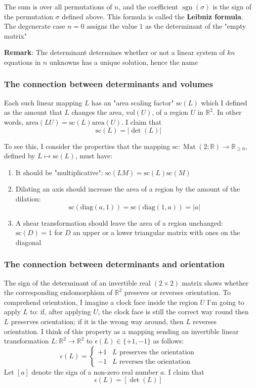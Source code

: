\documentclass{article}
\DeclareMathOperator{\sgn}{sgn}
\DeclareMathOperator{\Mat}{Mat}
\begin{document}
The sum is over all permutations of $n$, and the coefficient $\sgn(\sigma)$ is the sign of the permutation $\sigma$ defined above. This formula is called the \textbf{Leibniz formula}. The degenerate case $n = 0$ assigns the value $1$ as the determinant of the "empty matrix"

\textbf{Remark}: The determinant determines whether or not a linear system of $kn$ equations in $n$ unknowns has a unique solution, hence the name

\subsubsection{The connection between determinants and volumes}

Each such linear mapping $L$ has an "area scaling factor" $\text{sc}(L)$ which I defined as the amount that $L$ changes the area, $\text{vol}(U)$, of a region $U$ in $\mathbb{R}^{2}$. In other words, $\text{area}(LU) = \text{sc}(L)\text{area}(U)$. I claim that
\[\text{sc}(L) = \lvert \det(L) \rvert\]

To see this, I consider the properties that the mapping $\text{sc} : \Mat(2;\mathbb{R})\to \mathbb{R}_{\ge 0}$, defined by $L \mapsto \text{sc}(L)$, must have:
\begin{enumerate}
    \item It should be "multiplicative": $\text{sc}(LM) = \text{sc}(L)\text{sc}(M)$
    \item Dilating an axis should increase the area of a region by the amount of the dilation:
        \[\text{sc}(\text{diag}(a, 1)) = \text{sc}(\text{diag}(1, a)) = \lvert a \rvert\]
    \item A shear transformation should leave the area of a region unchanged: $\text{sc}(D) = 1$ for $D$ an upper or a lower triangular matrix with ones on the diagonal
\end{enumerate}


\subsubsection{The connection between determinants and orientation}

The sign of the determinant of an invertible real $(2 \times 2)$ matrix shows whether the corresponding endomorphism of $\mathbb{R}^{2}$ preseves or reverses orientation. To comprehend orientation, I imagine a clock face inside the region $U$ I'm going to apply $L$ to: if, after applying $U$, the clock face is still the correct way round then $L$ preserves orientation; if it is the wrong way around, then $L$ reverses orientation. I think of this property as a mapping sending an invertible linear transformation $L : \mathbb{R}^{2}\to \mathbb{R}^{2}$ to $\epsilon(L)\in \{+1, -1\}$ as follows:
\[\epsilon(L) = \begin{cases}
    +1 & \text{$L$ preserves the orientation} \\
    -1 & \text{$L$ reverses the orientation}
\end{cases}\]
Let $[a]$ denote the sign of a non-zero real number $a$. I claim that
\[\epsilon(L) = [\det(L)]\]
\end{document}
